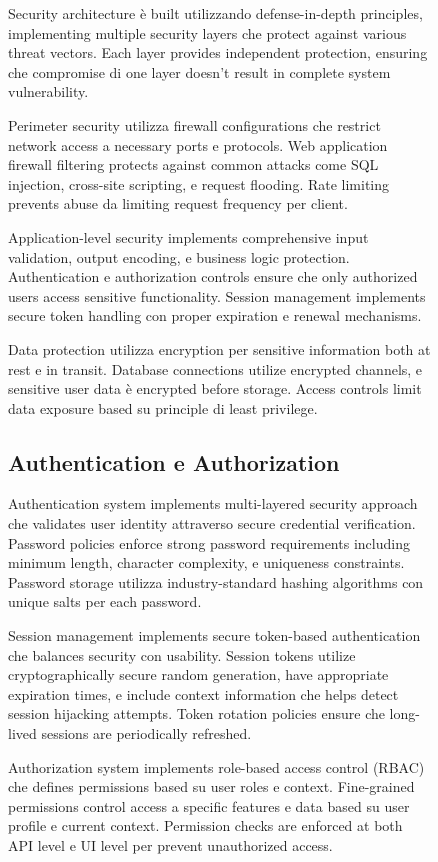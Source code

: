 \documentclass[12pt,a4paper]{article}
\begin{document}
\begin{figure}[H]
Security architecture è built utilizzando defense-in-depth principles, implementing multiple security layers che protect against various threat vectors. Each layer provides independent protection, ensuring che compromise di one layer doesn't result in complete system vulnerability.

Perimeter security utilizza firewall configurations che restrict network access a necessary ports e protocols. Web application firewall filtering protects against common attacks come SQL injection, cross-site scripting, e request flooding. Rate limiting prevents abuse da limiting request frequency per client.

Application-level security implements comprehensive input validation, output encoding, e business logic protection. Authentication e authorization controls ensure che only authorized users access sensitive functionality. Session management implements secure token handling con proper expiration e renewal mechanisms.

Data protection utilizza encryption per sensitive information both at rest e in transit. Database connections utilize encrypted channels, e sensitive user data è encrypted before storage. Access controls limit data exposure based su principle di least privilege.

\subsection{Authentication e Authorization}

Authentication system implements multi-layered security approach che validates user identity attraverso secure credential verification. Password policies enforce strong password requirements including minimum length, character complexity, e uniqueness constraints. Password storage utilizza industry-standard hashing algorithms con unique salts per each password.

Session management implements secure token-based authentication che balances security con usability. Session tokens utilize cryptographically secure random generation, have appropriate expiration times, e include context information che helps detect session hijacking attempts. Token rotation policies ensure che long-lived sessions are periodically refreshed.

Authorization system implements role-based access control (RBAC) che defines permissions based su user roles e context. Fine-grained permissions control access a specific features e data based su user profile e current context. Permission checks are enforced at both API level e UI level per prevent unauthorized access.


\end{figure}
\end{document}
